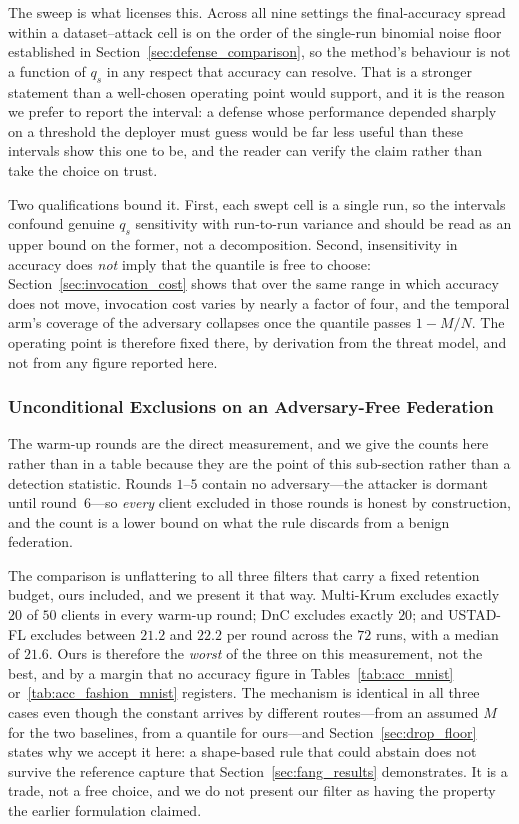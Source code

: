 \documentclass[journal]{IEEEtran}
\begin{document}
The sweep is what licenses this. Across all nine settings the final-accuracy spread within a dataset--attack cell is on the order of the single-run binomial noise floor established in Section~\ref{sec:defense_comparison}, so the method's behaviour is not a function of $q_s$ in any respect that accuracy can resolve. That is a stronger statement than a well-chosen operating point would support, and it is the reason we prefer to report the interval: a defense whose performance depended sharply on a threshold the deployer must guess would be far less useful than these intervals show this one to be, and the reader can verify the claim rather than take the choice on trust.

Two qualifications bound it. First, each swept cell is a single run, so the intervals confound genuine $q_s$ sensitivity with run-to-run variance and should be read as an upper bound on the former, not a decomposition. Second, insensitivity in accuracy does \emph{not} imply that the quantile is free to choose: Section~\ref{sec:invocation_cost} shows that over the same range in which accuracy does not move, invocation cost varies by nearly a factor of four, and the temporal arm's coverage of the adversary collapses once the quantile passes $1-M/N$. The operating point is therefore fixed there, by derivation from the threat model, and not from any figure reported here.

\subsubsection{Unconditional Exclusions on an Adversary-Free Federation}
\label{sec:no_adversary}
The warm-up rounds are the direct measurement, and we give the counts here rather than in a table because they are the point of this sub-section rather than a detection statistic. Rounds $1$--$5$ contain no adversary---the attacker is dormant until round~$6$---so \emph{every} client excluded in those rounds is honest by construction, and the count is a lower bound on what the rule discards from a benign federation.

The comparison is unflattering to all three filters that carry a fixed retention budget, ours included, and we present it that way. Multi-Krum excludes exactly $20$ of $50$ clients in every warm-up round; DnC excludes exactly $20$; and USTAD-FL excludes between $21.2$ and $22.2$ per round across the $72$ runs, with a median of $21.6$. Ours is therefore the \emph{worst} of the three on this measurement, not the best, and by a margin that no accuracy figure in Tables~\ref{tab:acc_mnist} or~\ref{tab:acc_fashion_mnist} registers. The mechanism is identical in all three cases even though the constant arrives by different routes---from an assumed $M$ for the two baselines, from a quantile for ours---and Section~\ref{sec:drop_floor} states why we accept it here: a shape-based rule that could abstain does not survive the reference capture that Section~\ref{sec:fang_results} demonstrates. It is a trade, not a free choice, and we do not present our filter as having the property the earlier formulation claimed.
\end{document}
